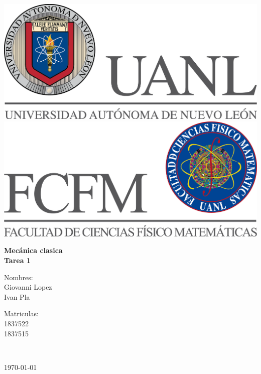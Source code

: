 \begin{titlepage}
\begin{center}
\hspace{-0.5cm}
\includegraphics[scale=0.4]{Images/uanl.png}
\hspace{2.5cm}
\includegraphics[scale=0.4]{Images/fcfm.png}\\
\vspace{5cm}
\begin{Large}
\textbf{
Mecánica clasica\vspace{1cm} \\
Tarea 1\vspace{3cm}\\}
\end{Large}
\begin{minipage}{0.49\linewidth}
Nombres:\\
Giovanni Lopez\\
Ivan Pla
\end{minipage}
\begin{minipage}{0.49\linewidth}
Matriculas:\\
1837522\\
1837515
\end{minipage}
\vspace{6cm}\\
\begin{flushright}
\today
\end{flushright}
\end{center}
\end{titlepage}
\pagebreak